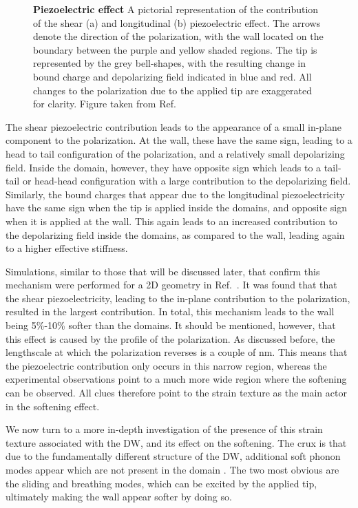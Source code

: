 \begin{figure}[h]
	\caption{\label{fig:BTO_depolarizing}{\bf Piezoelectric effect} A pictorial representation of the contribution of the shear (a) and longitudinal (b) piezoelectric effect. The arrows denote the direction of the polarization, with the wall located on the boundary between the purple and yellow shaded regions. The tip is represented by the grey bell-shapes, with the resulting change in bound charge and depolarizing field indicated in blue and red. All changes to the polarization due to the applied tip are exaggerated for clarity. Figure taken from Ref.~\cite{Stefani2020}}
\end{figure}

The shear piezoelectric contribution leads to the appearance of a small in-plane component to the polarization.
At the wall, these have the same sign, leading to a head to tail configuration of the polarization, and a relatively small depolarizing field.
Inside the domain, however, they have opposite sign which leads to a tail-tail or head-head configuration with a large contribution to the depolarizing field.
Similarly, the bound charges that appear due to the longitudinal piezoelectricity have the same sign when the tip is applied inside the domains, and opposite sign when it is applied at the wall.
This again leads to an increased contribution to the depolarizing field inside the domains, as compared to the wall, leading again to a higher effective stiffness.

Simulations, similar to those that will be discussed later, that confirm this mechanism were performed for a 2D geometry in Ref.~\cite{Stefani2020}.
It was found that that the shear piezoelectricity, leading to the in-plane contribution to the polarization, resulted in the largest contribution.
In total, this mechanism leads to the wall being 5\%-10\% softer than the domains.
It should be mentioned, however, that this effect is caused by the profile of the polarization. As discussed before, the lengthscale at which the polarization reverses is a couple of nm. This means that the piezoelectric contribution only occurs in this narrow region, whereas the experimental observations point to a much more wide region where the softening can be observed.
All clues therefore point to the strain texture as the main actor in the softening effect.

We now turn to a more in-depth investigation of the presence of this strain texture associated with the DW, and its effect on the softening.
The crux is that due to the fundamentally different structure of the DW, additional soft phonon modes appear which are not present in the domain \cite{Chen2020}.
The two most obvious are the sliding and breathing modes, which can be excited by the applied tip, ultimately making the wall appear softer by doing so.

